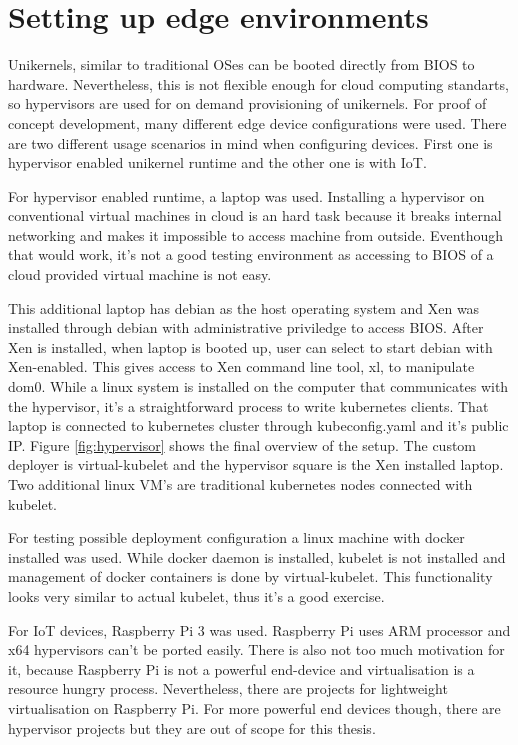
\section{Setting up edge environments}
Unikernels, similar to traditional OSes can be booted directly from BIOS to hardware. Nevertheless, this is not flexible enough for cloud computing standarts, so hypervisors are used for on demand provisioning of unikernels. For proof of concept development, many different edge device configurations were used. There are two different usage scenarios in mind when configuring devices. First one is hypervisor enabled unikernel runtime and the other one is with IoT.

For hypervisor enabled runtime, a laptop was used. Installing a hypervisor on conventional virtual machines in cloud is an hard task because it breaks internal networking and makes it impossible to access machine from outside. Eventhough that would work, it's not a good testing environment as accessing to BIOS of a cloud provided virtual machine is not easy.

This additional laptop has debian as the host operating system and Xen was installed through debian with administrative priviledge to access BIOS. After Xen is installed, when laptop is booted up, user can select to start debian with Xen-enabled. This gives access to Xen command line tool, xl, to manipulate dom0. While a linux system is installed on the computer that communicates with the hypervisor, it's a straightforward process to write kubernetes clients. That laptop is connected to kubernetes cluster through kubeconfig.yaml and it's public IP. Figure \ref{fig:hypervisor} shows the final overview of the setup. The custom deployer is virtual-kubelet and the hypervisor square is the Xen installed laptop. Two additional linux VM's are traditional kubernetes nodes connected with kubelet.

For testing possible deployment configuration a linux machine with docker installed was used. While docker daemon is installed, kubelet is not installed and management of docker containers is done by virtual-kubelet. This functionality looks very similar to actual kubelet, thus it's a good exercise.

For IoT devices, Raspberry Pi 3 was used. Raspberry Pi uses ARM processor and x64 hypervisors can't be ported easily. There is also not too much motivation for it, because Raspberry Pi is not a powerful end-device and virtualisation is a resource hungry process. Nevertheless, there are projects for lightweight virtualisation on Raspberry Pi. For more powerful end devices though, there are hypervisor projects but they are out of scope for this thesis.

